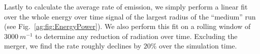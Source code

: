 Lastly to calculate the average rate of emission, we simply perform a linear fit over the whole energy over time signal of the largest radius of the ``medium'' run (see Fig.~\ref{ag:fig:EnergyPower}). We also perform this fit on a rolling window of $3000~m^{-1}$ to determine any reduction of radiation over time. Excluding the merger, we find the rate roughly declines by $20 \%$ over the simulation time. 
